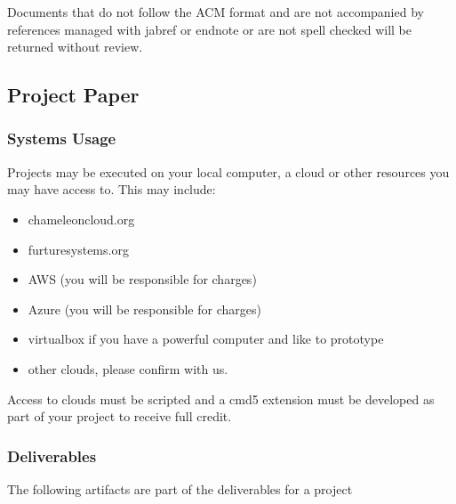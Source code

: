 Documents that do not follow the ACM format and are not accompanied by
references managed with jabref or endnote or are not spell checked will
be returned without review.


\subsection{Project Paper}

\subsubsection{Systems Usage}

Projects may be executed on your local computer, a cloud or other
resources you may have access to. This may include:

\begin{itemize}
\item chameleoncloud.org
\item furturesystems.org
\item AWS (you will be responsible for charges)
\item Azure (you will be responsible for charges)
\item virtualbox if you have a powerful computer and like to prototype
\item other clouds, please confirm with us.
\end{itemize}

Access to clouds must be scripted and a cmd5 extension must be
developed as part of your project to receive full credit.

\subsubsection{Deliverables}

The following artifacts are part of the deliverables for a project

